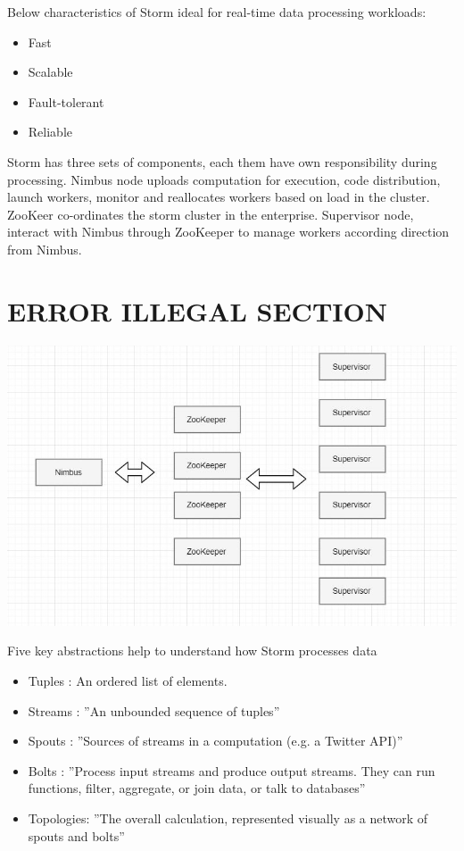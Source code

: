 Below characteristics of Storm ideal for real-time data processing workloads:

\begin{itemize}
\item Fast
\item Scalable
\item Fault-tolerant
\item Reliable
\end{itemize}
 
Storm has three sets of components, each them have own responsibility during processing. Nimbus node uploads 
computation for execution, code distribution, launch workers, monitor and reallocates 
workers based on load in the cluster.
ZooKeer co-ordinates the storm cluster in the enterprise. Supervisor node, 
interact with Nimbus through ZooKeeper to manage workers according direction from Nimbus.

\section{ERROR ILLEGAL SECTION}


\centering\includegraphics[width=\columnwidth]{images/Storm1.JPG}

  
Five key abstractions help to understand how Storm processes data

\begin{itemize}
\item Tuples : An ordered list of elements.
\item Streams : ''An unbounded sequence of tuples''~\cite{ hid-sp18-514-hwp}
\item Spouts : ''Sources of streams in a computation (e.g. a Twitter API)'' ~\cite{ hid-sp18-514-hwp}
\item Bolts : ''Process input streams and produce output streams. They can run functions, filter, aggregate, or join data, or talk to databases'' ~\cite{ hid-sp18-514-hwp}
\item Topologies: ''The overall calculation, represented visually as a network of spouts and bolts''~\cite{ hid-sp18-514-hwp}
\end{itemize}

